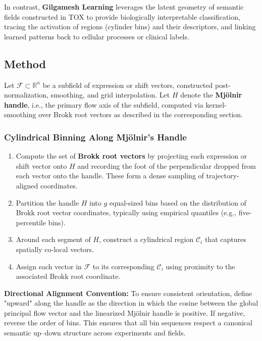 \documentclass{article}
\begin{document}
In contrast, \textbf{Gilgamesh Learning} leverages the latent geometry of semantic fields constructed in TOX to provide biologically interpretable classification, tracing the activation of regions (cylinder bins) and their descriptors, and linking learned patterns back to cellular processes or clinical labels.

\subsection{Method}

Let $\mathcal{F} \subset \mathbb{R}^n$ be a subfield of expression or shift vectors, constructed post-normalization, smoothing, and grid interpolation. Let $H$ denote the \textbf{Mj\"olnir handle}, i.e., the primary flow axis of the subfield, computed via kernel-smoothing over Brokk root vectors as described in the corresponding section.

\subsubsection{Cylindrical Binning Along Mj\"olnir’s Handle}

\begin{enumerate}
  \item Compute the set of \textbf{Brokk root vectors} by projecting each expression or shift vector onto $H$ and recording the foot of the perpendicular dropped from each vector onto the handle. These form a dense sampling of trajectory-aligned coordinates.
  \item Partition the handle $H$ into $g$ equal-sized bins based on the distribution of Brokk root vector coordinates, typically using empirical quantiles (e.g., five-percentile bins).
  \item Around each segment of $H$, construct a cylindrical region $\mathcal{C}_i$ that captures spatially co-local vectors.
  \item Assign each vector in $\mathcal{F}$ to its corresponding $\mathcal{C}_i$ using proximity to the associated Brokk root coordinate.
\end{enumerate}

\textbf{Directional Alignment Convention:} To ensure consistent orientation, define "upward" along the handle as the direction in which the cosine between the global principal flow vector and the linearized Mj\"olnir handle is positive. If negative, reverse the order of bins. This ensures that all bin sequences respect a canonical semantic up–down structure across experiments and fields.
\end{document}
